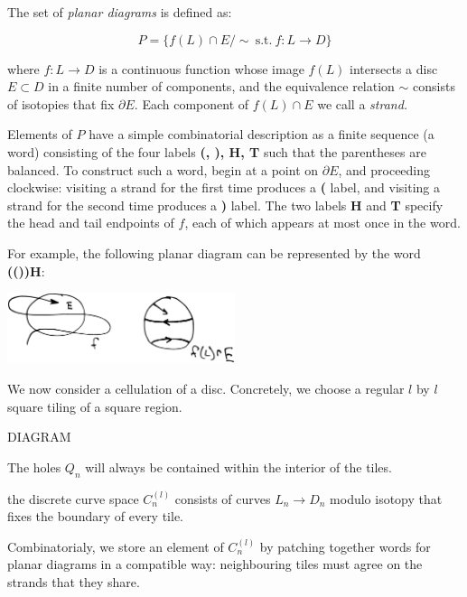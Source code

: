 \documentclass[12pt,a4paper]{article}
\begin{document}
The set of {\it planar diagrams} is defined as:

    $$ P = \{ f(L)\cap E / \sim \ \text{s.t.}\ f:L\to D \}$$

where $f:L\to D$ is a continuous function 
whose image $f(L)$ intersects a disc $E\subset D$ in a finite number of components,
and the equivalence relation $\sim$ consists of 
isotopies that fix $\partial E.$ %
Each component of $f(L)\cap E$ we call a {\it strand.}

Elements of $P$ have a simple combinatorial description 
as a finite sequence (a word) consisting of
the four labels {\bf (, ), H, T} such that 
the parentheses are balanced.
To construct such a word, begin at a point on $\partial E$, and proceeding
clockwise: visiting a strand for the first time produces a {\bf ( } label,
and visiting a strand for the second time produces a {\bf ) } label.
The two labels {\bf H} and {\bf T} specify the
head and tail endpoints of $f$, each of which appears at most once in the word.

For example, the following planar diagram can be represented by
the word {\bf(())H}:

\begin{center}
\includegraphics[width=0.5\textwidth]{planar.eps}
\end{center}




We now consider a cellulation of a disc.
Concretely, we choose a regular $l$ by $l$ square tiling of a square region.

DIAGRAM

The holes $Q_n$ will always be contained within the interior of the
tiles.

 the discrete curve space $C_n^{(l)}$ consists of
curves $L_n\to D_n$ modulo isotopy that fixes the boundary of
every tile.

Combinatorialy, we store an element of $C_n^{(l)}$ by patching
together words for planar diagrams in a compatible way: 
neighbouring tiles must agree on the strands that they share.
\end{document}
